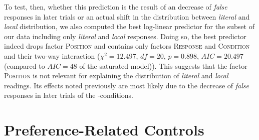 \documentclass[fleqn,reqno,10pt]{article}
\renewcommand{\es}{\acro{es}}
\begin{document}
To test, then, whether this prediction is the result of an decrease of
\emph{false} responses in later trials or an actual shift in the
distribution between \emph{literal} and \emph{local} distribution, we
also computed the best log-linear predictor for the subset of our data
including only \emph{literal} and \emph{local} responses. Doing so,
the best predictor indeed drops factor \textsc{Position} and contains
only factors \textsc{Response} and \textsc{Condition} and their
two-way interaction ($\chi^2 = 12.497$, $df=20$, $p = 0.898$, $AIC =
20.497$ (compared to $AIC=48$ of the saturated model)). This suggests
that the factor \textsc{Position} is not relevant for explaining the
distribution of \emph{literal} and \emph{local} readings. Its effects
noted previously are most likely due to the decrease of \emph{false}
responses in later trials of the \es-conditions.



\section{Preference-Related Controls}
\label{sec:pref-relat-contr}




\printbibliography[heading=bibintoc]
\end{document}
